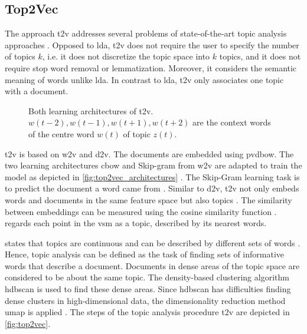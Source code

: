 \subsection{Top2Vec}\label{subsec:top2vec}

The approach \ac{t2v} addresses several problems of state-of-the-art topic analysis approaches \cite{Top2Vec2020}.
Opposed to \ac{lda}, \ac{t2v} does not require the user to specify the number of topics $k$, 
i.e. it does not discretize the topic space into $k$ topics, 
and it does not require stop word removal or lemmatization.
Moreover, it considers the semantic meaning of words unlike \ac{lda}.
In contrast to \ac{lda}, \ac{t2v} only associates one topic with a document.

\begin{figure}%
    \centering
    \qquad
    \caption[Two learning architectures of \ac{t2v}]{Both learning architectures of \ac{t2v}.
    $w(t-2), w(t-1), w(t+1), w(t+2)$ are the context words of the centre word $w(t)$ of topic $z(t)$.
    }%
    \label{fig:top2vec_architectures}%
\end{figure}

\ac{t2v} is based on \ac{w2v} and \ac{d2v}.
The documents are embedded using \ac{pvdbow}.
The two learning architectures \ac{cbow} and Skip-gram from \ac{w2v} are adapted to train the model as depicted in \autoref{fig:top2vec_architectures} \cite{Topic2Vec2015}.
The Skip-Gram learning task is to predict the document a word came from \cite{Top2Vec2020, Topic2Vec2015}.
Similar to \ac{d2v}, \ac{t2v} not only embeds words and documents in the same feature space but also topics \cite{Top2Vec2020, Topic2Vec2015}.
The similarity between embeddings can be measured using the cosine similarity function \cite{Topic2Vec2015}.
\citeauthor{Top2Vec2020} regards each point in the \ac{vsm} as a topic, described by its nearest words.

\citeauthor{Top2Vec2020} states that topics are continuous and can be described by different sets of words \cite{Top2Vec2020}.
Hence, topic analysis can be defined as the task of finding sets of informative words that describe a document.
Documents in dense areas of the topic space are considered to be about the same topic.
The density-based clustering algorithm \ac{hdbscan} is used to find these dense areas.
Since \ac{hdbscan} has difficulties finding dense clusters in high-dimensional data, 
the dimensionality reduction method \ac{umap} is applied \cite{Top2Vec2020}.
The steps of the topic analysis procedure \ac{t2v} are depicted in \autoref{fig:top2vec}.

